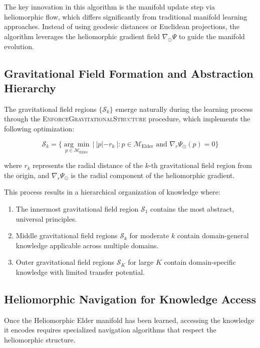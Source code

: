 The key innovation in this algorithm is the manifold update step via heliomorphic flow, which differs significantly from traditional manifold learning approaches. Instead of using geodesic distances or Euclidean projections, the algorithm leverages the heliomorphic gradient field $\nabla_{\odot} \Psi$ to guide the manifold evolution.

\subsection{Gravitational Field Formation and Abstraction Hierarchy}

The gravitational field regions $\{\mathcal{S}_k\}$ emerge naturally during the learning process through the \textsc{EnforceGravitationalStructure} procedure, which implements the following optimization:

\begin{equation}
\mathcal{S}_k = \{\underset{p \in \mathcal{M}_{\text{Elder}}}{\arg\min} \, |~|p| - r_k~| : p \in \mathcal{M}_{\text{Elder}} \text{ and } \nabla_r \Psi_{\odot}(p) = 0\}
\end{equation}

where $r_k$ represents the radial distance of the $k$-th gravitational field region from the origin, and $\nabla_r \Psi_{\odot}$ is the radial component of the heliomorphic gradient.

This process results in a hierarchical organization of knowledge where:

\begin{enumerate}
    \item The innermost gravitational field region $\mathcal{S}_1$ contains the most abstract, universal principles.
    \item Middle gravitational field regions $\mathcal{S}_k$ for moderate $k$ contain domain-general knowledge applicable across multiple domains.
    \item Outer gravitational field regions $\mathcal{S}_K$ for large $K$ contain domain-specific knowledge with limited transfer potential.
\end{enumerate}

\subsection{Heliomorphic Navigation for Knowledge Access}

Once the Heliomorphic Elder manifold has been learned, accessing the knowledge it encodes requires specialized navigation algorithms that respect the heliomorphic structure.

